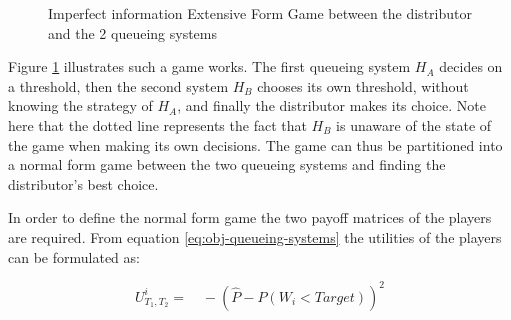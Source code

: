 \begin{figure}[h]
    \centering
    \caption{Imperfect information Extensive Form Game between the distributor 
    and the 2 queueing systems}
    \label{fig:imperfect-info-game}
\end{figure}

Figure \ref{fig:imperfect-info-game} illustrates such a game works. The first 
queueing system \(H_A\) decides on a threshold, then the second system \(H_B\)
chooses its own threshold, without knowing the strategy of \(H_A\), and finally
the distributor makes its choice. Note here that the dotted line represents the
fact that \(H_B\) is unaware of the state of the game when making its own 
decisions. The game can thus be partitioned into a normal form game between the
two queueing systems and finding the distributor's best choice. 

In order to define the normal form game the two payoff matrices of the players 
are required. From equation \ref{eq:obj-queueing-systems} the utilities of the
players can be formulated as:

\begin{equation}
    U_{T_1, T_2}^i = \quad -\left( 
        \hat{P} - P(W_i < \textit{Target}) 
    \right)^2
\end{equation}

